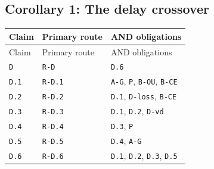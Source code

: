 \documentclass[11pt,letterpaper]{article}
\begin{document}
{\subsection{Corollary 1: The delay crossover}
\begin{longtable}{>{\raggedright\arraybackslash}p{.14\linewidth}>{\raggedright\arraybackslash}p{.21\linewidth}>{\raggedright\arraybackslash}p{.54\linewidth}}
\toprule
Claim & Primary route & AND obligations \\
\midrule\endfirsthead
\toprule
Claim & Primary route & AND obligations \\
\midrule\endhead
\bottomrule\endfoot
\texttt{D} & \texttt{R-D} & \texttt{D.6} \\[3pt]
\texttt{D.1} & \texttt{R-D.1} & \texttt{A-G}, \texttt{P}, \texttt{B-OU}, \texttt{B-CE} \\[3pt]
\texttt{D.2} & \texttt{R-D.2} & \texttt{D.1}, \texttt{D-loss}, \texttt{B-CE} \\[3pt]
\texttt{D.3} & \texttt{R-D.3} & \texttt{D.1}, \texttt{D.2}, \texttt{D-vd} \\[3pt]
\texttt{D.4} & \texttt{R-D.4} & \texttt{D.3}, \texttt{P} \\[3pt]
\texttt{D.5} & \texttt{R-D.5} & \texttt{D.4}, \texttt{A-G} \\*[3pt]
\texttt{D.6} & \texttt{R-D.6} & \texttt{D.1}, \texttt{D.2}, \texttt{D.3}, \texttt{D.5} \\[3pt]
\end{longtable}
}
\end{document}
